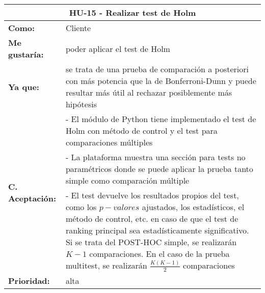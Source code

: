 \begin{table}[H]
	\begin{tabular}{| p{3cm}| p{11cm} |}
		\hline
		\multicolumn{2}{|c|}{\textbf{HU-15} - Realizar test de Holm} \\ \hline
		\textbf{Como:} & Cliente \\ \hline
		\textbf{Me gustaría:} & poder aplicar el test de Holm \\ \hline
		\textbf{Ya que:} & se trata de una prueba de comparación a posteriori con más potencia que la de Bonferroni-Dunn y puede resultar más útil al rechazar posiblemente más hipótesis \\ \hline
		\multirow{3}{11cm}{\textbf{C. Aceptación:}} & - El módulo de Python tiene implementado el test de Holm con método de control y el test para comparaciones múltiples \\
		& - La plataforma muestra una sección para tests no paramétricos donde se puede aplicar la prueba tanto simple como comparación múltiple \\
		& - El test devuelve los resultados propios del test, como los $p-valores$ ajustados, los estadísticos, el método de control, etc. en caso de que el test de ranking principal sea estadísticamente significativo. Si se trata del POST-HOC simple, se realizarán $K-1$ comparaciones. En el caso de la prueba multitest, se realizarán $\frac{K(K-1)}{2}$ comparaciones \\ \hline
		\textbf{\textbf{Prioridad:}} & alta \\ \hline
	\end{tabular}
\end{table}



